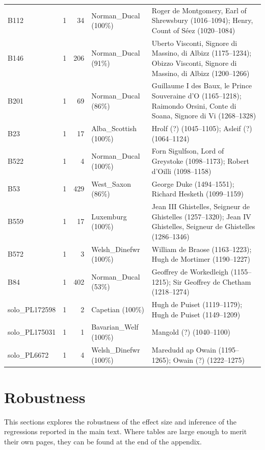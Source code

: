 \documentclass[12pt]{article}
\theoremstyle{definition}
\theoremstyle{remark}
\begin{document}
\begin{longtable}{lrrp{2.6cm}p{5.9cm}}
B112 & 1 & 34 & Norman\_Ducal (100\%) & {\footnotesize Roger de Montgomery, Earl of Shrewsbury (1016--1094); Henry, Count of Séez (1020--1084)} \\
B146 & 1 & 206 & Norman\_Ducal (91\%) & {\footnotesize Uberto Visconti, Signore di Massino, di Albizz (1175--1234); Obizzo Visconti, Signore di Massino, di Albizz (1200--1266)} \\
B201 & 1 & 69 & Norman\_Ducal (86\%) & {\footnotesize Guillaume I des Baux, le Prince Souveraine d'O (1165--1218); Raimondo Orsini, Conte di Soana, Signore di Vi (1268--1328)} \\
B23 & 1 & 17 & Alba\_Scottish (100\%) & {\footnotesize Hrolf (?) (1045--1105); Asleif (?) (1064--1124)} \\
B522 & 1 & 4 & Norman\_Ducal (100\%) & {\footnotesize Forn Sigulfson, Lord of Greystoke (1098--1173); Robert d'Oilli (1098--1158)} \\
B53 & 1 & 429 & West\_Saxon (86\%) & {\footnotesize George Duke (1494--1551); Richard Hesketh (1099--1159)} \\
B559 & 1 & 17 & Luxemburg (100\%) & {\footnotesize Jean III Ghistelles, Seigneur de Ghistelles (1257--1320); Jean IV Ghistelles, Seigneur de Ghistelles (1286--1346)} \\
B572 & 1 & 3 & Welsh\_Dinefwr (100\%) & {\footnotesize William de Braose (1163--1223); Hugh de Mortimer (1190--1227)} \\
B84 & 1 & 402 & Norman\_Ducal (53\%) & {\footnotesize Geoffrey de Workedleigh (1155--1215); Sir Geoffrey de Chetham (1218--1274)} \\
solo\_PL172598 & 1 & 2 & Capetian (100\%) & {\footnotesize Hugh de Puiset (1119--1179); Hugh de Puiset (1149--1209)} \\
solo\_PL175031 & 1 & 1 & Bavarian\_Welf (100\%) & {\footnotesize Mangold (?) (1040--1100)} \\
solo\_PL6672 & 1 & 4 & Welsh\_Dinefwr (100\%) & {\footnotesize Maredudd ap Owain (1195--1265); Owain (?) (1222--1275)} \\
\end{longtable}





\section{Robustness}
\label{app:robust}
This sections explores the robustness of the effect size and inference of the regressions reported in the main text. Where tables are large enough to merit their own pages, they can be found at the end of the appendix.
\end{document}
